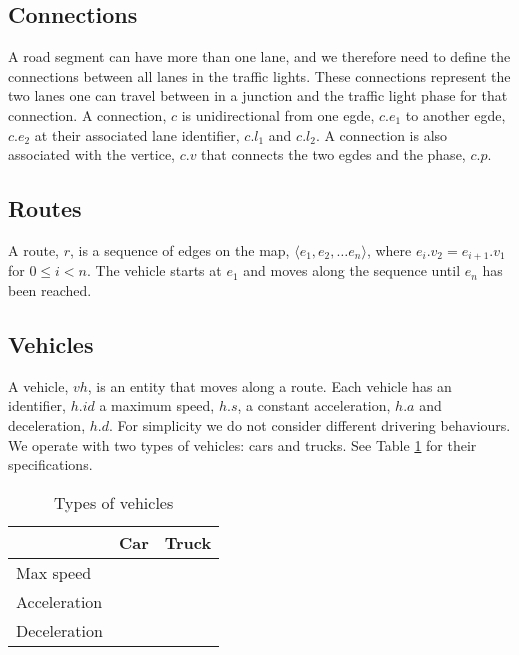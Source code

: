 \subsection{Connections}
A road segment can have more than one lane, and we therefore need to define the connections between all lanes in the traffic lights.
These connections represent the two lanes one can travel between in a junction and the traffic light phase for that connection.
A connection, $c$ is unidirectional from one egde, $c.e_1$ to another egde, $c.e_2$ at their associated lane identifier, $c.l_1$ and $c.l_2$. A connection is also associated with the vertice, $c.v$ that connects the two egdes and the phase, $c.p$.



\begin{comment}
\subsection{Trajectory}
A trajectory, $T$, is a sequence of connected edges on the map, $\langle e_1, e_2, \dots e_n \rangle$, where $e_i.v_2 = e_{i+1}.v_1$ for $0\leq i< n$.
The vehicle starts at $e_1$ and moves along the sequence until $e_n$ has been reached.
\end{comment}

\subsection{Routes}
A route, $r$, is a sequence of edges on the map, $\langle e_1, e_2, \dots e_n \rangle$, where $e_i.v_2 = e_{i+1}.v_1$ for $0\leq i< n$.
The vehicle starts at $e_1$ and moves along the sequence until $e_n$ has been reached.

\subsection{Vehicles}
A vehicle, $vh$, is an entity that moves along a route.
Each vehicle has an identifier, $h.id$ a maximum speed, $h.s$, a constant acceleration, $h.a$ and deceleration, $h.d$.
For simplicity we do not consider different drivering behaviours.
We operate with two types of vehicles: cars and trucks. See Table \ref{table.vehicleTypes} for their specifications.
\begin{table}
\centering
\begin{tabular}{|l|l|l|}\hline
				& Car	& Truck \\\hline
Max speed 		& 		& \\\hline
Acceleration 	&		& \\\hline
Deceleration 	&		& \\\hline
\end{tabular}
\caption{Types of vehicles}\label{table.vehicleTypes}
\end{table}

